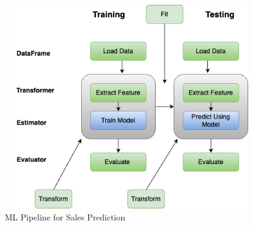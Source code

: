\begin{center}
	\begin{figure}[h!]
		\begin{center}
			\includegraphics[height=90mm, width=130mm]{Images/MLPipeline}
		\end{center}
		\caption{ ML Pipeline for Sales Prediction}
	\end{figure}
\end{center}
